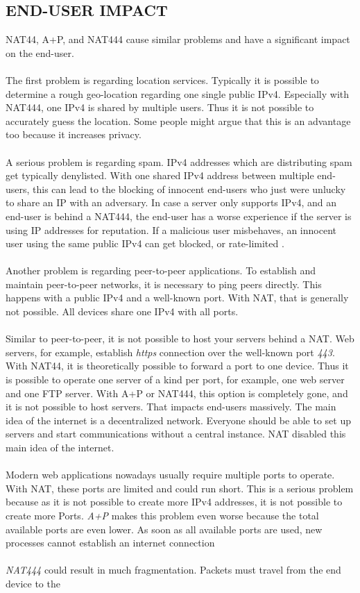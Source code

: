 \documentclass[format=sigconf, natbib=true, nonacm=true]{acmart}
\begin{document}
    \subsection*{END-USER IMPACT}
    NAT44, A+P, and NAT444 cause similar problems and have a significant impact on the end-user.\\\\The first problem is regarding location services. Typically it is possible to determine a rough geo-location regarding one single public IPv4. Especially with NAT444, one IPv4 is shared by multiple users. Thus it is not possible to accurately guess the location. Some people might argue that this is an advantage too because it increases privacy\cite{Hughes2022_C04}.\\\\A serious problem is regarding spam. IPv4 addresses which are distributing spam get typically denylisted. With one shared IPv4 address between multiple end-users, this can lead to the blocking of innocent end-users who just were unlucky to share an IP with an adversary. In case a server only supports IPv4, and an end-user is behind a NAT444, the end-user has a worse experience if the server is using IP addresses for reputation. If a malicious user misbehaves, an innocent user using the same public IPv4 can get blocked, or rate-limited \cite{Hughes2022_C04}.\\\\Another problem is regarding peer-to-peer applications. To establish and maintain peer-to-peer networks, it is necessary to ping peers directly. This happens with a public IPv4 and a well-known port. With NAT, that is generally not possible. All devices share one IPv4 with all ports\cite{Hughes2022_C04}.\\\\Similar to peer-to-peer, it is not possible to host your servers behind a NAT. Web servers, for example, establish \textit{https} connection over the well-known port \textit{443}. With NAT44, it is theoretically possible to forward a port to one device. Thus it is possible to operate one server of a kind per port, for example, one web server and one FTP server. With A+P or NAT444, this option is completely gone, and it is not possible to host servers. That impacts end-users massively. The main idea of the internet is a decentralized network. Everyone should be able to set up servers and start communications without a central instance. NAT disabled this main idea of the internet\cite{Hughes2022_C04}.\\\\Modern web applications nowadays usually require multiple ports to operate. With NAT, these ports are limited and could run short. This is a serious problem because as it is not possible to create more IPv4 addresses, it is not possible to create more Ports\cite{Hughes2022_C04}. \textit{A+P} makes this problem even worse because the total available ports are even lower. As soon as all available ports are used, new processes cannot establish an internet connection\\\\ \textit{NAT444} could result in much fragmentation. Packets must travel from the end device to the 
\end{document}
